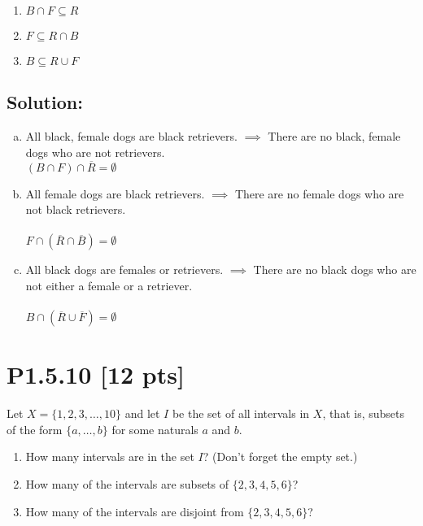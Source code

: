 \documentclass[12pt]{article}
\begin{document}
\begin{enumerate}[label=(\alph*)]
\item $B \cap F \subseteq R$
\item $F \subseteq R \cap B$
\item $B \subseteq R \cup F$

\end{enumerate}

\subsection*{\textbf{Solution:}}
\begin{enumerate}[(a)]
    \item All black, female dogs are black retrievers. $\implies$ There are no black, female dogs who are not retrievers.
	\\$(B \cap F) \cap \overline R = \emptyset$

    \item All female dogs are black retrievers. $\implies$ There are no female dogs who are not black retrievers.
	\\\\$F \cap (\overline R \cap \overline B) = \emptyset$

    \item All black dogs are females or retrievers. $\implies$ There are no black dogs who are not either a female or a retriever.
	\\\\$B \cap (\overline R \cup \overline F) = \emptyset$

\end{enumerate}


\newpage
\section*{\textbf{P1.5.10} [12 pts]}
Let $X = \{1, 2, 3, \dots, 10\}$ and let $I$ be the set of all intervals in $X$, that is, subsets of the form $\{a, \dots, b\}$ for some naturals $a$ and $b$.
\begin{enumerate}[label=(\alph*)]
    \item How many intervals are in the set $I$? (Don’t forget the empty set.) 
    \item How many of the intervals are subsets of $\{2, 3, 4, 5, 6\}$?
    \item How many of the intervals are disjoint from $\{2, 3, 4, 5, 6\}$?
\end{enumerate}
\end{document}

